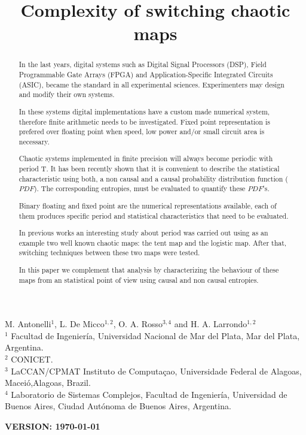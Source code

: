 \begin{frontmatter}

	\title{Complexity of switching chaotic maps}
	M. Antonelli$^{1}$, L. De Micco$^{1,2}$, O. A. Rosso$^{3,4}$ and H. A. Larrondo$^{1,2}$\\
	$^{1}$ Facultad de Ingenier\'ia, Universidad Nacional de Mar del Plata, Mar del Plata, Argentina.\\
	$^{2}$ CONICET.\\
	$^{3}$ LaCCAN/CPMAT Instituto de Computa\c{c}ao, Universidade Federal de Alagoas, Macei\'o,Alagoas, Brazil.\\
	$^{4}$ Laboratorio de Sistemas Complejos, Facultad de
	Ingenier\'ia, Universidad de Buenos Aires, Ciudad Aut\'onoma de
	Buenos Aires, Argentina.\\

\begin{abstract}
In the last years, digital systems such as Digital Signal Processors (DSP), Field Programmable Gate Arrays (FPGA) and Application-Specific Integrated Circuits (ASIC), became the standard in all experimental sciences.
Experimenters may design and modify their own systems.

In these systems digital implementations have a custom made numerical system, therefore finite arithmetic needs to be investigated.
Fixed point representation is prefered over floating point when  speed, low power and/or small circuit area is necessary.

Chaotic systems implemented in finite precision will always become periodic with period T.
It has been recently shown that it is convenient to describe the statistical characteristic using both, a non causal and a causal probability distribution function ($PDF$).
The corresponding entropies, must be evaluated to quantify these $PDF$'s.  

Binary floating and fixed point are the numerical representations available, each of them produces specific period and statistical characteristics that need to be evaluated.

In previous works an interesting study about period was carried out using as an example two well known chaotic maps: the tent map and the logistic map.
After that, switching techniques between these two maps were tested.

In this paper we complement that analysis by characterizing the behaviour of these maps from an statistical point of view using causal and non causal entropies.

\end{abstract}
\maketitle
\end{frontmatter}
{\bf VERSION: \today}